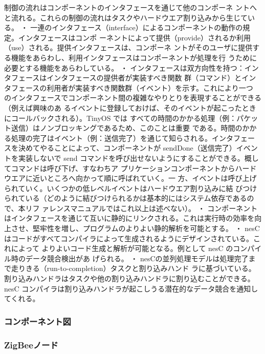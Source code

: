 \documentclass[12pt]{jreport}
\begin{document}
制御の流れはコンポーネントのインタフェースを通じて他のコンポーネ
ントへと流れる。これらの制御の流れはタスクやハードウエア割り込みから生じている。
・ 一連のインタフェース（interface）によるコンポーネントの動作の規定。インタフェースはコンポ
ーネントによって提供（provide）されるか利用（use）される。提供インタフェースは、コンポーネ
ントがそのユーザに提供する機能をあらわし、利用インタフェースはコンポーネントが処理を行
うために必要とする機能をあらわしている。
・ インタフェースは双方向性を持つ：インタフェースはインタフェースの提供者が実装すべき関数
群（コマンド）とインタフェースの利用者が実装すべき関数群（イベント）を示す。これにより一つ
のインタフェースでコンポーネント間の複雑なやりとりを表現することができる（例えば興味のあ
るイベントに登録しておけば、そのイベントが起こったときにコールバックされる）。TinyOS では
すべての時間のかかる処理（例：パケット送信）はノンブロッキングであるため、このことは重要
である。時間のかかる処理の完了はイベント（例：送信完了）を通じて知らされる。インタフェー
スを決めてやることによって、コンポーネントが sendDone（送信完了）イベントを実装しないで
send コマンドを呼び出せないようにすることができる。概してコマンドは呼び下げ、すなわちア
プリケーションコンポーネントからハードウエアに近いところへ向かって順に呼ばれていく。一
方、イベントは呼び上げられていく。いくつかの低レベルイベントはハードウエア割り込みに結
びつけられている（どのように結びつけられるかは基本的にはシステム依存であるので、本リフ
ァレンスマニュアルではこれ以上は述べない）。
・ コンポーネントはインタフェースを通じて互いに静的にリンクされる。これは実行時の効率を向
上させ、堅牢性を増し、プログラムのよりよい静的解析を可能とする。
・ nesC はコードがすべてコンパイラによって生成されるようにデザインされている。これによって
よりよいコード生成と解析が可能となる。例として nesC のコンパイル時のデータ競合検出があ
げられる。
・ nesCの並列処理モデルは処理完了まで走りきる（run-to-completion）タスクと割り込みハンド
ラに基づいている。割り込みハンドラはタスクや他の割り込みハンドラに割り込むことができる。
nesC コンパイラは割り込みハンドラが起こしうる潜在的なデータ競合を通知してくれる。

\subsubsection{コンポーネント図}

\subsubsection{ZigBeeノード}

\end{document}
